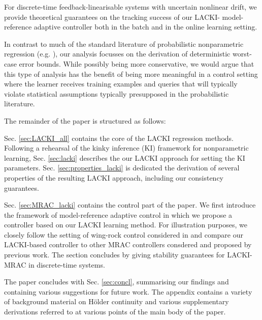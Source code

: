 For discrete-time feedback-linearisable systems with uncertain nonlinear drift, we provide theoretical guarantees on the tracking success of our LACKI- model-reference adaptive controller both in the batch and in the online learning setting. 

In contrast to much of the standard literature of probabilistic nonparametric regression (e.g. \cite{Gyoerfi2002,Tsybakov2009}), our analysis focusses on the derivation of deterministic  worst-case error bounds. While possibly being more conservative, we would argue that this type of analysis has the benefit of being more meaningful in a control setting where the learner receives training examples and queries that will typically violate statistical assumptions typically presupposed  in the probabilistic literature.

The remainder of the paper is structured as follows: 

Sec. \ref{sec:LACKI_all} contains the core of the LACKI regression methods. Following a rehearsal of the kinky inference (KI) framework for nonparametric learning, Sec. \ref{sec:lacki} describes the our LACKI approach for setting the KI parameters. Sec. \ref{sec:properties_lacki} is dedicated the derivation of several properties of the resulting LACKI approach, including our consistency guarantees.

Sec. \ref{sec:MRAC_lacki} contains the control part of the paper. We first introduce the framework of model-reference adaptive control in which we propose a controller based on our LACKI learning method.  For illustration purposes, we closely follow the setting of wing-rock control considered in \cite{Chowdhary2013,ChowdharyCDC2013} and compare our LACKI-based controller to other MRAC controllers consdered and proposed by previous work. The section concludes by giving stability guarantees for LACKI-MRAC in discrete-time systems.

The paper concludes with Sec. \ref{sec:concl}, summarising our findings and containing various suggestions for future work. The appendix contains a variety of background material on 
H\"older continuity and various supplementary derivations referred to at various points of the main body of the paper. 



